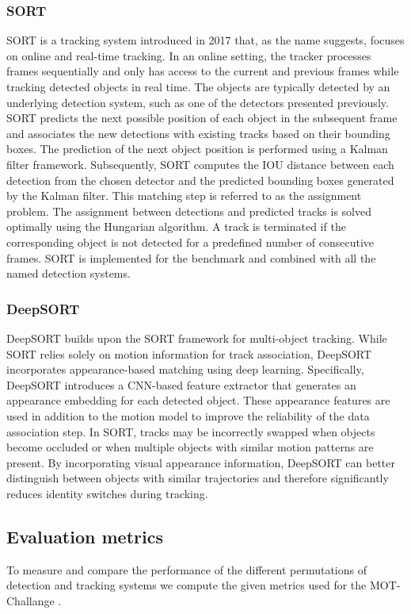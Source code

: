 \subsubsection{SORT}
\ac{SORT} is a tracking system introduced in 2017 that, as the name suggests, focuses on online and real-time tracking. In an online setting, the tracker processes frames sequentially and only has access to the current and previous frames while tracking detected objects in real time. The objects are typically detected by an underlying detection system, such as one of the detectors presented previously. SORT predicts the next possible position of each object in the subsequent frame and associates the new detections with existing tracks based on their bounding boxes. The prediction of the next object position is performed using a Kalman filter framework. Subsequently, SORT computes the \ac{IOU} distance between each detection from the chosen detector and the predicted bounding boxes generated by the Kalman filter. This matching step is referred to as the assignment problem.
The assignment between detections and predicted tracks is solved optimally using the Hungarian algorithm. A track is terminated if the corresponding object is not detected for a predefined number of consecutive frames. SORT is implemented for the benchmark and combined with 
all the named detection systems.

\subsubsection{DeepSORT}
\ac{DeepSORT} builds upon the SORT framework for multi-object tracking. 
While SORT relies solely on motion information for track association, 
DeepSORT incorporates appearance-based matching using deep learning. 
Specifically, DeepSORT introduces a CNN-based feature extractor that 
generates an appearance embedding for each detected object.
These appearance features are used in addition to the motion model to 
improve the reliability of the data association step. In SORT, tracks 
may be incorrectly swapped when objects become occluded or when multiple 
objects with similar motion patterns are present. By incorporating visual 
appearance information, DeepSORT can better distinguish between objects 
with similar trajectories and therefore significantly reduces identity 
switches during tracking.

\subsection{Evaluation metrics}
To measure and compare the performance of the different permutations of detection and tracking systems we compute the given metrics used for the MOT-Challange \cite{}. 

